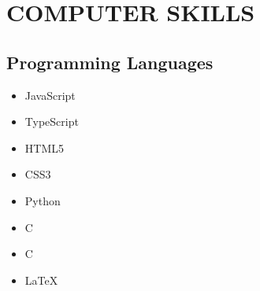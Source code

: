 \documentclass[10pt,a4paper,sans]{moderncv} %
\newcommand*{\authorimg}[1]{%
	\raisebox{-.3\baselineskip}{%
		\texttt{[image: \#1]}%
	}%
}
\begin{document}
\section{COMPUTER SKILLS}

\vspace{1em}
\subsection{Programming Languages}
\begin{multicols}{4} 
	\begin{itemize}
		\item \authorimg{pictures/js.png} JavaScript
		\vspace{5pt}
		\item \authorimg{pictures/typescript.png} TypeScript
		\vspace{5pt}
		\item \authorimg{pictures/html5.png} HTML5 
		\vspace{5pt}
		\item \authorimg{pictures/css3.png} CSS3
		\vspace{5pt}
		\item \authorimg{pictures/python.png} Python 
		\vspace{5pt}
		\item \authorimg{pictures/cpp.png} C\raisebox{1pt}{\tiny++}
		\vspace{5pt}
		\item \authorimg{pictures/c.png} C
		\vspace{5pt}
		\item \authorimg{pictures/latex.png} \LaTeX
		\vspace{5pt}
	\end{itemize}
\end{multicols}
\end{document}
